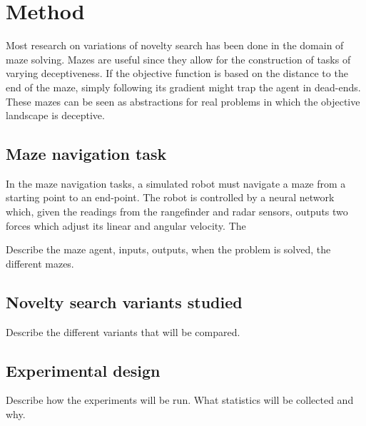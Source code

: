 \section{Method}
Most research on variations of novelty search has been done in the domain of maze solving. Mazes are useful
since they allow for the construction of tasks of varying deceptiveness. If the objective function is
based on the distance to the end of the maze, simply following its gradient might trap the agent in
dead-ends. These mazes can be seen as abstractions for real problems in which the objective
landscape is deceptive.

\subsection{Maze navigation task}
In the maze navigation tasks, a simulated robot must navigate a maze from a starting point to an end-point.
The robot is controlled by a neural network which, given the readings from the rangefinder and radar
sensors, outputs two forces which adjust its linear and angular velocity. The 

Describe the maze agent, inputs, outputs, when the problem is solved, the different mazes.

\subsection{Novelty search variants studied}
Describe the different variants that will be compared.

\subsection{Experimental design}
Describe how the experiments will be run. What statistics will be collected and why.
